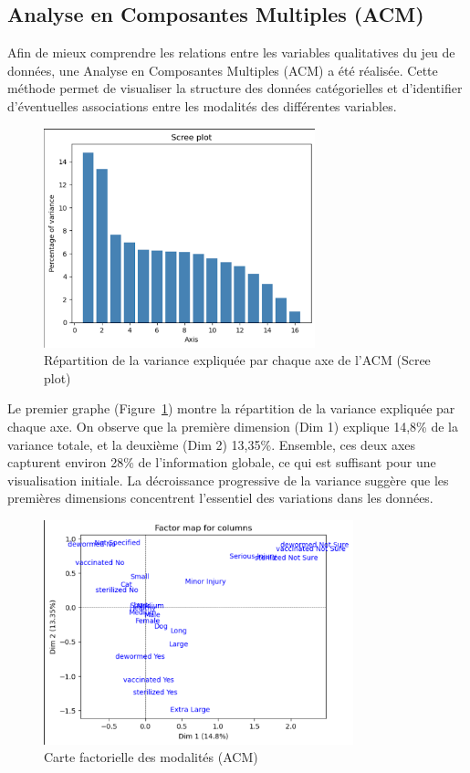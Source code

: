\documentclass[a4paper,12pt]{article}
\begin{document}
\subsection{Analyse en Composantes Multiples (ACM)}

Afin de mieux comprendre les relations entre les variables qualitatives du jeu de données, une Analyse en Composantes Multiples (ACM) a été réalisée. Cette méthode permet de visualiser la structure des données catégorielles et d’identifier d’éventuelles associations entre les modalités des différentes variables.

\begin{figure}[H]
    \centering
    \includegraphics[width=0.7\textwidth]{acm_variance.png}
    \caption{Répartition de la variance expliquée par chaque axe de l'ACM (Scree plot)}
    \label{fig:acm_scree}
\end{figure}

Le premier graphe (Figure~\ref{fig:acm_scree}) montre la répartition de la variance expliquée par chaque axe. On observe que la première dimension (Dim 1) explique 14,8\% de la variance totale, et la deuxième (Dim 2) 13,35\%. Ensemble, ces deux axes capturent environ 28\% de l'information globale, ce qui est suffisant pour une visualisation initiale. La décroissance progressive de la variance suggère que les premières dimensions concentrent l’essentiel des variations dans les données.

\begin{figure}[H]
    \centering
    \includegraphics[width=0.8\textwidth]{acm_factor_map.png}
    \caption{Carte factorielle des modalités (ACM)}
    \label{fig:acm_modalites}
\end{figure}
\end{document}
